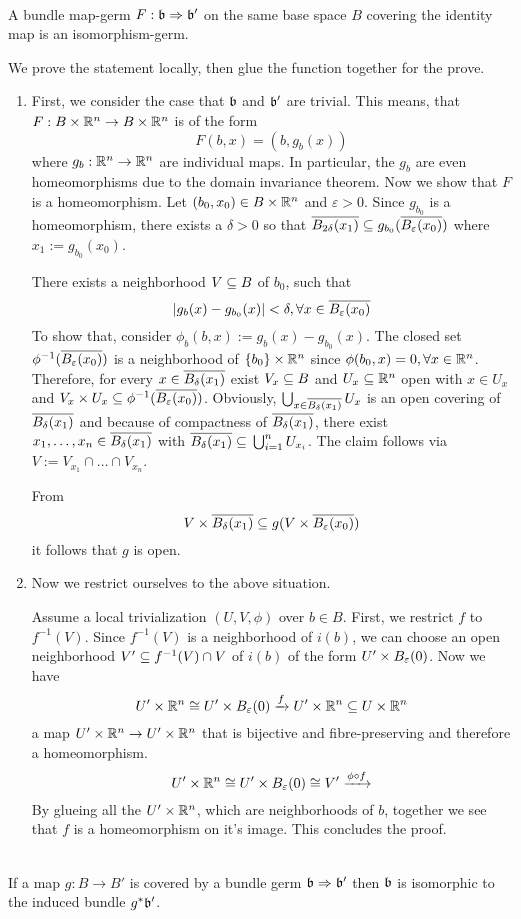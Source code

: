  \\
A bundle map-germ $F: \mathfrak{b} \Rightarrow \mathfrak{b}'$ on the same base space $B$ covering the identity map is an isomorphism-germ.
\begin{myproof}
We prove the statement locally, then glue the function together for the prove.
\begin{enumerate}
    \item
    First, we consider the case that $\mathfrak{b}$ and $\mathfrak{b}'$ are trivial.
    This means, that $F: B \times \mathbb{R}^n \to B \times \mathbb{R}^n$ is of the form
    \[ F(b, x) = (b, g_b(x)) \]
    where $g_b: \mathbb{R}^n \to \mathbb{R}^n$ are individual maps.
    In particular, the $g_b$ are even homeomorphisms due to the domain invariance theorem.
    Now we show that $F$ is a homeomorphism.
    Let $(b_0, x_0) \in B \times \mathbb{R}^n$ and $\varepsilon > 0$.
    Since $g_{b_0}$ is a homeomorphism, there exists a $\delta > 0$ so that
    $\clball[2\delta][x_1] \sub g_{b_0}(\clball[\varepsilon][x_0])$ where $x_1 := g_{b_0}(x_0)$.

    There exists a neighborhood $V \subseteq{} B$ of $b_0$, such that
    \[ \abs{g_b(x) - g_{b_0}(x)} < \delta, \forall x \in \clball[\varepsilon][x_0] \]
    To show that, consider $\phi_b(b, x) := g_b(x) - g_{b_0}(x)$.
    The closed set $\phi^{-1}(\clball[\varepsilon][x_0])$ is a neighborhood of $\{b_0\} \times \mathbb{R}^n$ since
    $\phi(b_0, x) = 0, \forall x \in \mathbb{R}^n$.
    Therefore, for every $x \in \clball[\delta][x_1]$ exist $V_x \subseteq{} B$ and $U_x \subseteq{} \mathbb{R}^n$ open with $x \in U_x$ and $V_x \times U_x \sub \phi^{-1}(\clball[\varepsilon][x_0])$.
    Obviously, $\bigcup_{x \in \clball[\delta][x_1]} U_x$ is an open covering of $\clball[\delta][x_1]$ and because of compactness of $\clball[\delta][x_1]$, there
    exist $x_1, \dots, x_n \in \clball[\delta][x_1]$ with $\clball[\delta][x_1] \sub \bigcup_{i = 1}^{n} U_{x_i}$.
    The claim follows via $V := V_{x_1} \cap \dots \cap V_{x_n}$.

    From
    \[ V \times \clball[\delta][x_1] \sub g(V \times \clball[\varepsilon][x_0]) \]
    it follows that $g$ is open.
    \item  %
    Now we restrict ourselves to the above situation.

    Assume a local trivialization $(U, V, \phi)$ over $b \in B$.
    First, we restrict $f$ to $f^{-1}(V)$.
    Since $f^{-1}(V)$ is a neighborhood of $i(b)$, we can choose an open neighborhood $V' \subseteq{} f^{-1}(V) \cap V$ of $i(b)$ of the form $U' \times \ball[\varepsilon]$.
    Now we have
    \[ U' \times \R^n \cong U' \times \ball[\varepsilon] \xto{f} U' \times \R^n \sub U \times \R^n \]
    a map $U' \times \mathbb{R}^n \to U' \times \mathbb{R}^n$ that is bijective and fibre-preserving and therefore a homeomorphism.
    \[ U' \times \R^n \cong U' \times \ball[\varepsilon] \cong V' \xto{\phi \circ f} \]
    By glueing all the $U' \times \mathbb{R}^n$, which are neighborhoods of $b$, together we see that $f$ is a homeomorphism on it's image.
    This concludes the proof.
\end{enumerate}
\end{myproof}

 \\
If a map $g: B \to B'$ is covered by a bundle germ $\mathfrak{b} \Rightarrow \mathfrak{b}'$ then $\mathfrak{b}$ is isomorphic to the induced bundle $g^*\mathfrak{b}'$.
\begin{myproof}
\end{myproof}